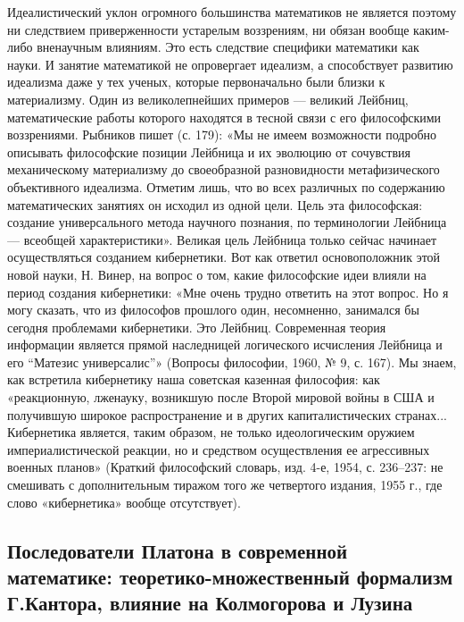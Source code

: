 Идеалистический  уклон огромного  большинства математиков  не является
поэтому ни  следствием приверженности устарелым воззрениям,  ни обязан
вообще каким-либо  вненаучным влияниям.  Это есть  следствие специфики
математики как  науки. И занятие математикой  не опровергает идеализм,
а  способствует   развитию  идеализма  даже  у   тех  ученых,  которые
первоначально  были близки  к  материализму.  Один из  великолепнейших
примеров --- великий Лейбниц, математические работы которого находятся
в  тесной связи  с его  философскими воззрениями.  Рыбников пишет  (с.
179): «Мы не имеем  возможности подробно описывать философские позиции
Лейбница  и их  эволюцию от  сочувствия механическому  материализму до
своеобразной  разновидности  метафизического  объективного  идеализма.
Отметим  лишь,  что во  всех  различных  по содержанию  математических
занятиях  он исходил  из одной  цели. Цель  эта философская:  создание
универсального метода научного познания,  по терминологии Лейбница ---
всеобщей характеристики». Великая цель Лейбница только сейчас начинает
осуществляться созданием  кибернетики. Вот как  ответил основоположник
этой новой  науки, Н. Винер, на  вопрос о том, какие  философские идеи
влияли на период  создания кибернетики: «Мне очень  трудно ответить на
этот  вопрос. Но  я  могу  сказать, что  из  философов прошлого  один,
несомненно, занимался бы сегодня  проблемами кибернетики. Это Лейбниц.
Современная теория информации  является прямой наследницей логического
исчисления Лейбница и его ``Матезис универсалис''» (Вопросы философии,
1960,  №  9,  с.  167).  Мы  знаем,  как  встретила  кибернетику  наша
советская  казенная философия:  как «реакционную,  лженауку, возникшую
после Второй мировой войны в  США и получившую широкое распространение
и в  других капиталистических  странах... Кибернетика  является, таким
образом, не только  идеологическим оружием империалистической реакции,
но и  средством осуществления ее агрессивных  военных планов» (Краткий
философский  словарь, изд.  4-е,  1954, с.  236--237:  не смешивать  с
дополнительным тиражом того же четвертого  издания, 1955 г., где слово
«кибернетика» вообще отсутствует).

\subsection{Последователи    Платона    в   современной    математике:
теоретико-множественный формализм Г.Кантора,  влияние на Колмогорова и
Лузина}

